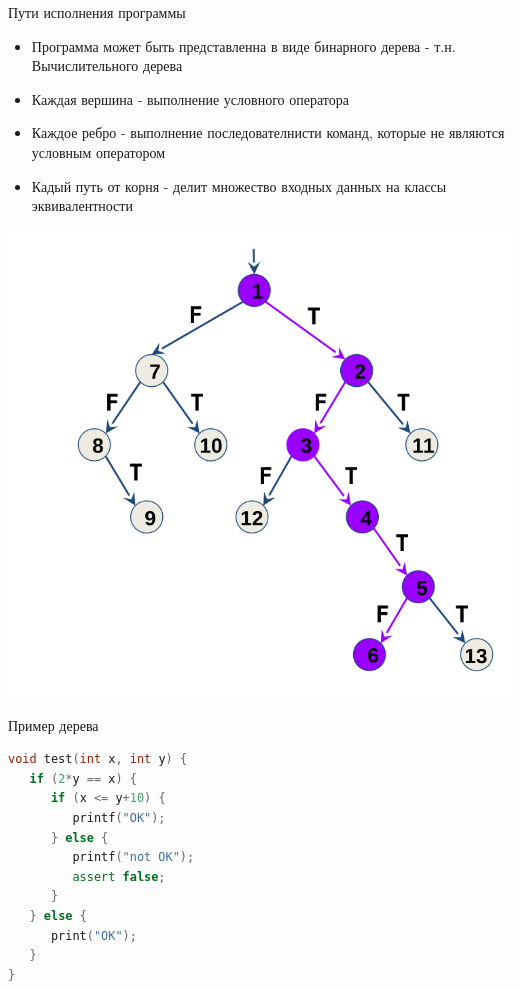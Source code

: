 \documentclass{beamer}
\begin{document}
\begin{frame}{Пути исполнения программы}
\begin{minipage}{0.49\textwidth}
\begin{itemize}
\item Программа может быть представленна в виде бинарного дерева - т.н. Вычислительного дерева
\item Каждая вершина - выполнение условного оператора
\item Каждое ребро - выполнение последователнисти команд, которые не являются условным оператором
\item Кадый путь от корня - делит множество входных данных на классы эквивалентности
\end{itemize}
\end{minipage}
\begin{minipage}{0.49\textwidth}
\includegraphics[scale=0.2]{tree.png}
\end{minipage}
\end{frame}

\begin{frame}[fragile]{Пример дерева}
\begin{minipage}{0.49\textwidth}
\begin{lstlisting}[language=C++]
void test(int x, int y) {
   if (2*y == x) {
      if (x <= y+10) {
         printf("OK");
      } else {
         printf("not OK");
         assert false;
      }
   } else {
      print("OK");
   }
}
\end{lstlisting}
\end{minipage}
\end{frame}
\end{document}
